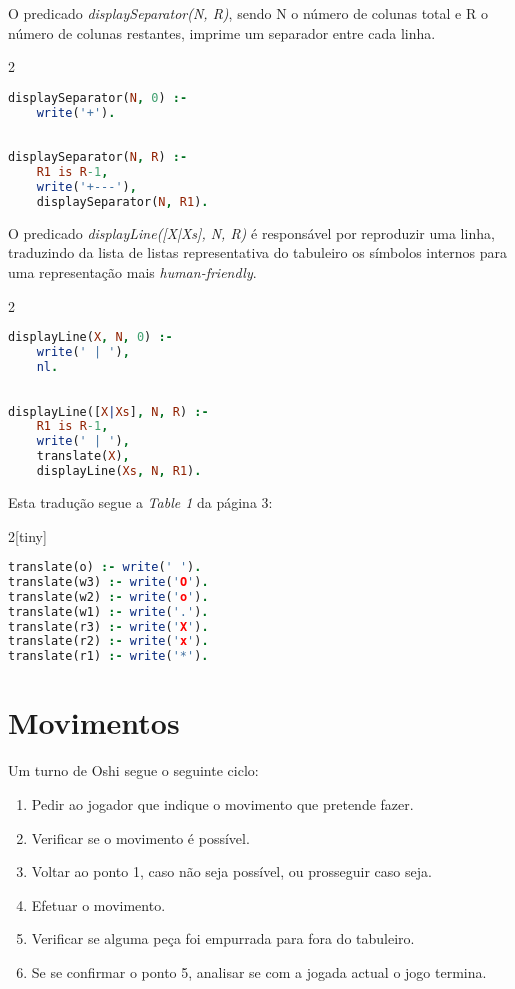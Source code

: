 \documentclass[a4paper]{article}
\begin{document}
O predicado \textit{displaySeparator(N, R)}, sendo N o número de colunas total e R o número de colunas restantes, imprime um separador entre cada linha.

\begin{multicols}{2}
\begin{lstlisting}[language=Prolog]
displaySeparator(N, 0) :- 
	write('+').
	
	
displaySeparator(N, R) :- 
	R1 is R-1, 
	write('+---'), 
	displaySeparator(N, R1).
\end{lstlisting}
\end{multicols}

O predicado \textit{displayLine([X|Xs], N, R)} é responsável por reproduzir uma linha, traduzindo da lista de listas representativa do tabuleiro os símbolos internos para uma representação mais \textit{human-friendly}. 

\begin{multicols}{2}
\begin{lstlisting}[language=Prolog]
displayLine(X, N, 0) :- 
	write(' | '), 
	nl.
	
	
displayLine([X|Xs], N, R) :- 
	R1 is R-1, 
	write(' | '),
	translate(X),
	displayLine(Xs, N, R1).
\end{lstlisting}
\end{multicols}

Esta tradução segue a \textit{Table 1} da página 3:

\begin{multicols}{2}[tiny]
\begin{lstlisting}[language=Prolog]
translate(o) :- write(' ').
translate(w3) :- write('O').
translate(w2) :- write('o').
translate(w1) :- write('.').
translate(r3) :- write('X').
translate(r2) :- write('x').
translate(r1) :- write('*').
\end{lstlisting}
\end{multicols}

\clearpage

\section{Movimentos}

Um turno de Oshi segue o seguinte ciclo:

\begin{enumerate}
	\item Pedir ao jogador que indique o movimento que pretende fazer.
	\item Verificar se o movimento é possível.
	\item Voltar ao ponto 1, caso não seja possível, ou prosseguir caso seja.
	\item Efetuar o movimento.
	\item Verificar se alguma peça foi empurrada para fora do tabuleiro.
	\item Se se confirmar o ponto 5, analisar se com a jogada actual o jogo termina.
\end{enumerate}
\end{document}

